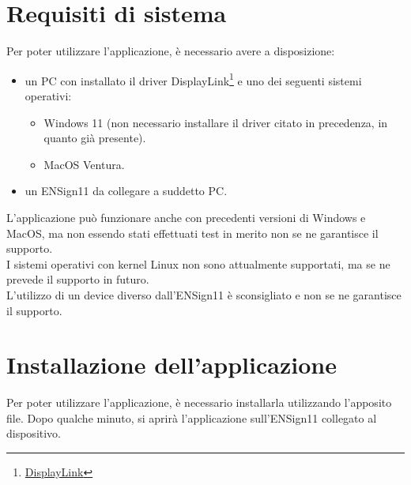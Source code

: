 \section{Requisiti di sistema}
Per poter utilizzare l'applicazione, è necessario avere a disposizione:
\begin{itemize}
    \item un PC con installato il driver DisplayLink\footnote[3]{\href{https://www.synaptics.com/products/displaylink-graphics}{DisplayLink}} e uno dei seguenti sistemi operativi: \begin{itemize}
    \item Windows 11 (non necessario installare il driver citato in precedenza, in quanto già presente).
    \item MacOS Ventura.
    \end{itemize}
    \item un ENSign11 da collegare a suddetto PC.
\end{itemize}
L'applicazione può funzionare anche con precedenti versioni di Windows e MacOS, ma non essendo stati effettuati test in merito non se ne garantisce il supporto.\\
I sistemi operativi con kernel Linux non sono attualmente supportati, ma se ne prevede il supporto in futuro.\\
L'utilizzo di un device diverso dall'ENSign11 è sconsigliato e non se ne garantisce il supporto.
\section{Installazione dell'applicazione}
Per poter utilizzare l'applicazione, è necessario installarla utilizzando l'apposito file.
Dopo qualche minuto, si aprirà l'applicazione sull'ENSign11 collegato al dispositivo.
\newpage
